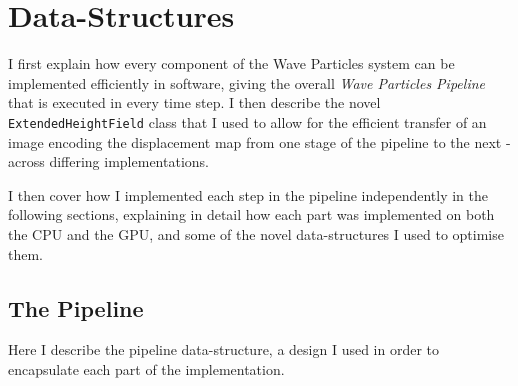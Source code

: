 \documentclass[12pt,a4paper,twoside]{report}
\begin{document}




\section{Data-Structures}

I first explain how every component of the Wave Particles system can be
implemented efficiently in software, giving the overall \textit{Wave Particles
Pipeline} that is executed in every time step. I then describe the novel
\texttt{ExtendedHeightField} class that I used to allow for the efficient
transfer of an image encoding the displacement map from one stage of the
pipeline to the next - across differing implementations.

I then cover how I implemented each step in the pipeline independently in
the following sections, explaining in detail how each part was implemented on
both the CPU and the GPU, and some of the novel data-structures I used to
optimise them.

\subsection{The Pipeline}
\label{sec:implementation_pipeline}

Here I describe the pipeline data-structure, a design I used in order
to encapsulate each part of the implementation.
\end{document}

